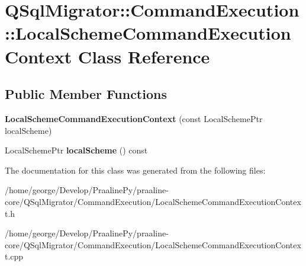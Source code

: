 \hypertarget{class_q_sql_migrator_1_1_command_execution_1_1_local_scheme_command_execution_context}{}\section{Q\+Sql\+Migrator\+:\+:Command\+Execution\+:\+:Local\+Scheme\+Command\+Execution\+Context Class Reference}
\label{class_q_sql_migrator_1_1_command_execution_1_1_local_scheme_command_execution_context}
\subsection*{Public Member Functions}
\begin{DoxyCompactItemize}
\item 
\mbox{\label{class_q_sql_migrator_1_1_command_execution_1_1_local_scheme_command_execution_context_a391f4265518464027c011b6bc8bf2d0e}} 
{\bfseries Local\+Scheme\+Command\+Execution\+Context} (const Local\+Scheme\+Ptr local\+Scheme)
\item 
\mbox{\label{class_q_sql_migrator_1_1_command_execution_1_1_local_scheme_command_execution_context_a77f027883e95fe96ce25bb41eb339d88}} 
Local\+Scheme\+Ptr {\bfseries local\+Scheme} () const
\end{DoxyCompactItemize}


The documentation for this class was generated from the following files\+:\begin{DoxyCompactItemize}
\item 
/home/george/\+Develop/\+Praaline\+Py/praaline-\/core/\+Q\+Sql\+Migrator/\+Command\+Execution/Local\+Scheme\+Command\+Execution\+Context.\+h\item 
/home/george/\+Develop/\+Praaline\+Py/praaline-\/core/\+Q\+Sql\+Migrator/\+Command\+Execution/Local\+Scheme\+Command\+Execution\+Context.\+cpp\end{DoxyCompactItemize}
